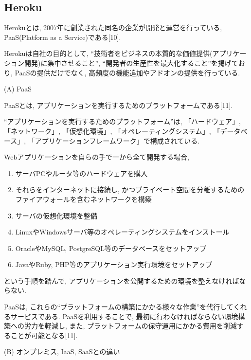 \subsection{Heroku}
Herokuとは, 2007年に創業された同名の企業が開発と運営を行っている, PaaS(Platform as a Service)である[10].

Herokuは自社の目的として, “技術者をビジネスの本質的な価値提供(アプリケーション開発)に集中させること”, “開発者の生産性を最大化すること”を掲げており, PaaSの提供だけでなく, 高頻度の機能追加やアドオンの提供を行っている.

\begin{description}
\item (A) PaaS

PaaSとは, アプリケーションを実行するためのプラットフォームである[11].

“アプリケーションを実行するためのプラットフォーム”は, 「ハードウェア」, 「ネットワーク」, 「仮想化環境」, 「オペレーティングシステム」, 「データベース」, 「アプリケーションフレームワーク」で構成されている.

Webアプリケーションを自らの手で一から全て開発する場合,
\begin{enumerate}
\item サーバPCやルータ等のハードウェアを購入

\item それらをインターネットに接続し, かつプライベート空間を分離するためのファイアウォールを含むネットワークを構築

\item サーバの仮想化環境を整備

\item LinuxやWindowsサーバ等のオペレーティングシステムをインストール

\item OracleやMySQL, PostgreSQL等のデータベースをセットアップ

\item JavaやRuby, PHP等のアプリケーション実行環境をセットアップ
\end{enumerate}

という手順を踏んで, アプリケーションを公開するための環境を整えなければならない.

PaaSは, これらの“プラットフォームの構築にかかる様々な作業”を代行してくれるサービスである.
PaaSを利用することで, 最初に行わなければならない環境構築への労力を軽減し, また, プラットフォームの保守運用にかかる費用を削減することが可能となる[11].

\item (B) オンプレミス, IaaS, SaaSとの違い


\end{description}
